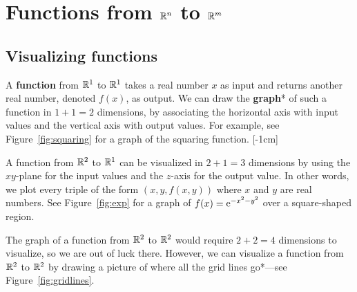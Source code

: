 \documentclass[prettycode,shellescape]{watsonbook}
\begin{document}
\section{Functions from $\mathbb{R}^n$ to $\mathbb{R}^m$} \label{sec:RntoRn}

\subsection{Visualizing functions}

A \textbf{function} from $\mathbb{R}^1$ to $\mathbb{R}^1$ takes a real number $x$ as
input and returns another real number, denoted $f(x)$, as output. We
can draw the \textbf{graph}* of such a function in $1 + 1 = 2$
dimensions, by associating the horizontal axis with input values and
the vertical axis with output values. For example, see
Figure~\ref{fig:squaring} for a graph of the squaring
function. [-1cm]

A function from $\mathbb{R}^2$ to $\mathbb{R}^1$ can be visualized in $2 + 1 = 3$
dimensions by using the $xy$-plane for the input values and the
$z$-axis for the output value. In other words, we plot every triple of
the form $(x,y,f(x,y))$ where $x$ and $y$ are real numbers. See
Figure~\ref{fig:exp} for a graph of $f(x) = \mathrm{e}^{-x^2 - y^2}$ over a
square-shaped region.

The graph of a function from $\mathbb{R}^2$ to $\mathbb{R}^2$ would require
$2 + 2 = 4$ dimensions to visualize, so we are out of luck
there. However, we can visualize a function from $\mathbb{R}^2$ to $\mathbb{R}^2$ by
drawing a picture of where all the grid lines go*---see
Figure~\ref{fig:gridlines}.
\end{document}
